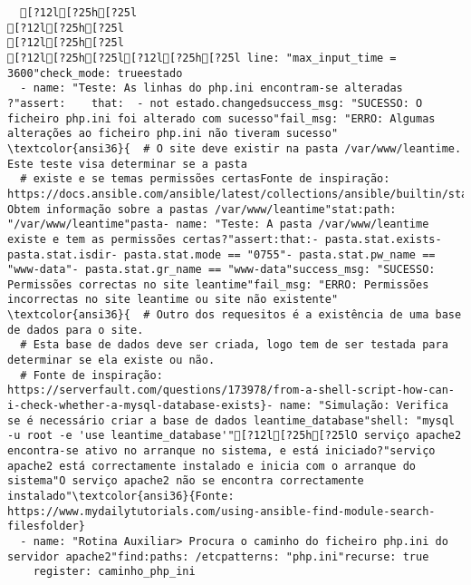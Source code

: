 \documentclass{scrartcl}
\begin{document}
\begin{Verbatim}
  [?12l[?25h[?25l
[?12l[?25h[?25l
[?12l[?25h[?25l
[?12l[?25h[?25l[?12l[?25h[?25l line: "max_input_time = 3600"check_mode: trueestado
  - name: "Teste: As linhas do php.ini encontram-se alteradas ?"assert:    that:  - not estado.changedsuccess_msg: "SUCESSO: O ficheiro php.ini foi alterado com sucesso"fail_msg: "ERRO: Algumas alterações ao ficheiro php.ini não tiveram sucesso"
\textcolor{ansi36}{  # O site deve existir na pasta /var/www/leantime. Este teste visa determinar se a pasta
  # existe e se temas permissões certasFonte de inspiração: https://docs.ansible.com/ansible/latest/collections/ansible/builtin/stat_module.html}: Obtem informação sobre a pastas /var/www/leantime"stat:path: "/var/www/leantime"pasta- name: "Teste: A pasta /var/www/leantime existe e tem as permissões certas?"assert:that:- pasta.stat.exists- pasta.stat.isdir- pasta.stat.mode == "0755"- pasta.stat.pw_name == "www-data"- pasta.stat.gr_name == "www-data"success_msg: "SUCESSO: Permissões correctas no site leantime"fail_msg: "ERRO: Permissões incorrectas no site leantime ou site não existente"
\textcolor{ansi36}{  # Outro dos requesitos é a existência de uma base de dados para o site.
  # Esta base de dados deve ser criada, logo tem de ser testada para determinar se ela existe ou não.
  # Fonte de inspiração: https://serverfault.com/questions/173978/from-a-shell-script-how-can-i-check-whether-a-mysql-database-exists}- name: "Simulação: Verifica se é necessário criar a base de dados leantime_database"shell: "mysql -u root -e 'use leantime_database'"[?12l[?25h[?25lO serviço apache2 encontra-se ativo no arranque no sistema, e está iniciado?"serviço apache2 está correctamente instalado e inicia com o arranque do sistema"O serviço apache2 não se encontra correctamente instalado"\textcolor{ansi36}{Fonte: https://www.mydailytutorials.com/using-ansible-find-module-search-filesfolder}
  - name: "Rotina Auxiliar> Procura o caminho do ficheiro php.ini do servidor apache2"find:paths: /etcpatterns: "php.ini"recurse: true
    register: caminho_php_ini

\end{Verbatim}
\end{document}
